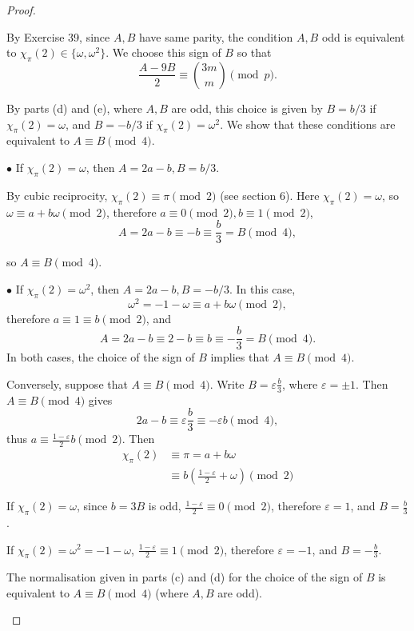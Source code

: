 \documentclass[11pt,a4paper]{article}
\begin{document}
\begin{proof}
\begin{enumerate}
 By Exercise 39, since $A,B$ have same parity, the condition $A,B$ odd is equivalent to $\chi_\pi(2) \in \{\omega, \omega^2\}$. We choose this sign of $B$ so that
 $$ \frac{A-9B}{2} \equiv \binom{3m}{m} \pmod p.$$
 
 By parts (d) and (e), where $A,B$ are odd, this choice is given by $B = b/3$ if $\chi_\pi(2) = \omega$, and $B = -b/3$ if $\chi_\pi(2) = \omega^2$. We show that these conditions are equivalent to $A\equiv B \pmod 4$.
 
 $\bullet$ If $\chi_\pi(2) = \omega$, then $A = 2a-b, B = b/3$.
 
 By cubic reciprocity, $\chi_\pi(2) \equiv \pi \pmod 2$ (see section 6). Here $\chi_\pi(2) = \omega$, so $\omega \equiv a + b \omega \pmod 2$, therefore $a \equiv 0 \pmod 2, b\equiv 1 \pmod 2$, 
$$A = 2a - b \equiv -b \equiv \frac{b}{3}  = B \pmod 4,$$

so $A \equiv B \pmod 4$.


 
 $\bullet$ If $\chi_\pi(2) = \omega^2$, then $A = 2a-b, B = -b/3$. In this case,
 $$\omega^2 = - 1 - \omega \equiv a + b \omega \pmod 2,$$
 therefore $a \equiv 1 \equiv b \pmod 2$, and
 $$A  = 2a - b \equiv 2 - b \equiv b \equiv -\frac{b}{3} = B \pmod 4.$$
 In both cases, the choice of the sign of $B$ implies that $A \equiv B \pmod 4$.
 
 \bigskip
 
Conversely, suppose that $A \equiv B \pmod 4$.  Write $B = \varepsilon \frac{b}{3}$, where $\varepsilon = \pm 1$. Then $A \equiv B \pmod 4$ gives
$$2a-b \equiv \varepsilon \frac{b}{3} \equiv -\varepsilon b \pmod 4,$$
thus $a \equiv \frac{1-\varepsilon}{2} b \pmod 2$. Then
\begin{align*}
\chi_\pi(2) &\equiv \pi = a + b \omega\\
&\equiv b\left( \frac{1-\varepsilon}{2} + \omega\right) \pmod 2
\end{align*}

 If $\chi_\pi(2) = \omega$, since $b = 3B$ is odd, $ \frac{1-\varepsilon}{2}  \equiv 0 \pmod 2$, therefore $\varepsilon = 1$, and $B = \frac{b}{3}$.
 
 If $\chi_\pi(2) = \omega^2 = - 1 - \omega$, $ \frac{1-\varepsilon}{2}  \equiv 1 \pmod 2$, therefore $\varepsilon = -1$, and $B = -\frac{b}{3}$.
 
 The normalisation given in parts (c) and (d) for the choice of the sign of $B$ is equivalent to $A \equiv B \pmod 4$ (where $A,B$ are odd).
\end{enumerate}

\end{proof}
\end{document}
